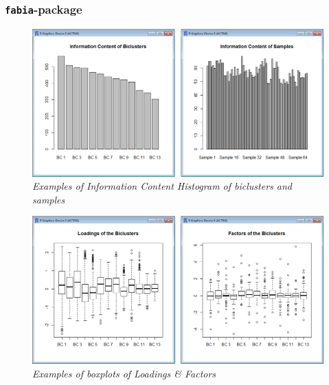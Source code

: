 \documentclass[a4paper]{article}\usepackage[]{graphicx}\usepackage[]{color}
\begin{document}
\subsubsection{\texttt{fabia}-package}
\begin{figure}[H]
\centering
\includegraphics[scale=0.4]{figures/fabiaplot_example1.png}
\caption{{\it Examples of Information Content
Histogram of biclusters and samples}\label{fabiaplot_example1}}
\end{figure}
\begin{figure}[H]
\centering
\includegraphics[scale=0.4]{figures/fabiaplot_example2.png}
\caption{{\it Examples of boxplots of Loadings \&
Factors}\label{fabiaplot_example2}}
\end{figure}
\end{document}
